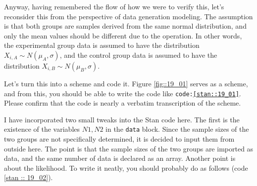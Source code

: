 \documentclass{ltjsbook}
\begin{document}
Anyway, having remembered the flow of how we were to verify this, let's reconsider this from the perspective of data generation modeling.
The assumption is that both groups are samples derived from the same normal distribution, and only the mean values should be different due to the operation. In other words, the experimental group data is assumed to have the distribution $X_{i,A}\sim N(\mu_A, \sigma)$, and the control group data is assumed to have the distribution $X_{i,B}\sim N(\mu_B,\sigma)$.

Let's turn this into a scheme and code it. Figure \ref{fig::19_01} serves as a scheme, and from this, you should be able to write the code like \texttt{code:\ref{stan::19_01}}. Please confirm that the code is nearly a verbatim transcription of the scheme.




I have incorporated two small tweaks into the Stan code here.
The first is the existence of the variables $N1, N2$ in the \texttt{data} block. Since the sample sizes of the two groups are not specifically determined, it is decided to input them from outside here. The point is that the sample sizes of the two groups are imported as data, and the same number of data is declared as an array.
Another point is about the likelihood. To write it neatly, you should probably do as follows (code \ref{stan :: 19_02}).

\end{document}
